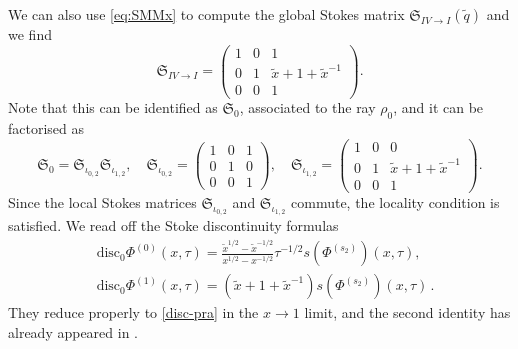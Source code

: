 \documentclass[12pt,reqno]{amsart}
\theoremstyle{definition}
\def\tq{\tilde{q}}
\def\tx{\tilde{x}}
\def\tx{\tilde{x}}
\def\mf{\mathfrak}
\begin{document}
We can also use \eqref{eq:SMMx} to compute the global Stokes matrix
$\mf{S}_{IV\rightarrow I}(\tq)$ and we find 
\begin{equation}
  \mf{S}_{IV\rightarrow I} = 
  \begin{pmatrix}
    1&0&1\\
    0&1&\tx+1+\tx^{-1}\\
    0&0&1
  \end{pmatrix}.
\end{equation}
Note that this can be identified as $\mf{S}_{0}$, associated to the ray
$\rho_0$, and it can be factorised as 
\begin{equation}
  \mf{S}_{0} = \mf{S}_{\iota_{0,2}}\mf{S}_{\iota_{1,2}},\quad
  \mf{S}_{\iota_{0,2}} =
  \begin{pmatrix}
    1&0&1\\
    0&1&0\\
    0&0&1
  \end{pmatrix},\quad
  \mf{S}_{\iota_{1,2}} =
  \begin{pmatrix}
    1&0&0\\
    0&1&\tx+1+\tx^{-1}\\
    0&0&1
  \end{pmatrix}.
\end{equation}
Since the local Stokes matrices $\mf{S}_{\iota_{0,2}}$ and
$\mf{S}_{\iota_{1,2}}$ commute, the locality condition is satisfied.
We read off the Stoke discontinuity formulas 
%
\begin{equation}
  \label{eq:dsPhi01x}
\begin{aligned}
  &\text{disc}_0 \Phi^{(0)}(x,\tau) =
  \frac{\tx^{1/2}-\tx^{-1/2}}{x^{1/2}-x^{-1/2}}
  \tau^{-1/2}s(\Phi^{(s_2)})(x,\tau), \\
  &\text{disc}_0 \Phi^{(1)}(x,\tau) =
  (\tx+1+\tx^{-1})s(\Phi^{(s_2)})(x,\tau) \,.
\end{aligned}
\end{equation}
They reduce properly to \eqref{disc-pra} in the $x\rightarrow 1$
limit, and the second identity has already appeared in
\cite{GGM:resurgent}.
\end{document}
